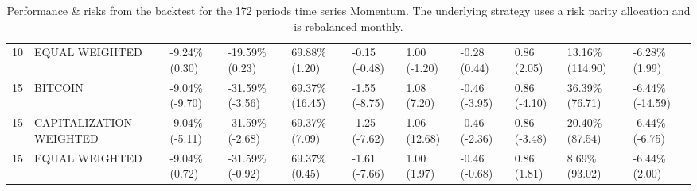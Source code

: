 \documentclass{article}
\begin{document}
\begin{landscape}
\begin{table}[H]
\begin{tabular}{p{0.4cm}|p{3cm}|p{1.65cm}|p{1.65cm}|p{1.65cm}|p{1.65cm}|p{1.65cm}|p{1.65cm}|p{1.65cm}|p{1.65cm}|p{1.65cm}}
\\ 
10&EQUAL WEIGHTED&-9.24\% (0.30)&-19.59\% (0.23)&69.88\% (1.20)&-0.15 (-0.48)&1.00 (-1.20)&-0.28 (0.44)&0.86 (2.05)&13.16\% (114.90)&-6.28\% (1.99)
\\ 
15&BITCOIN&-9.04\% (-9.70)&-31.59\% (-3.56)&69.37\% (16.45)&-1.55 (-8.75)&1.08 (7.20)&-0.46 (-3.95)&0.86 (-4.10)&36.39\% (76.71)&-6.44\% (-14.59)
\\ 
15&CAPITALIZATION WEIGHTED&-9.04\% (-5.11)&-31.59\% (-2.68)&69.37\% (7.09)&-1.25 (-7.62)&1.06 (12.68)&-0.46 (-2.36)&0.86 (-3.48)&20.40\% (87.54)&-6.44\% (-6.75)
\\ 

15&EQUAL WEIGHTED&-9.04\% (0.72)&-31.59\% (-0.92)&69.37\% (0.45)&-1.61 (-7.66)&1.00 (1.97)&-0.46 (-0.68)&0.86 (1.81)&8.69\% (93.02)&-6.44\% (2.00)
\\ 

\bottomrule
  \end{tabular}
  \label{tab:tsmom172riskparity}
   \caption{Performance \& risks from the backtest for the 172 periods time series Momentum. The underlying strategy uses a risk parity allocation and is rebalanced monthly.}
\end{table}
\end{landscape}
\end{document}
